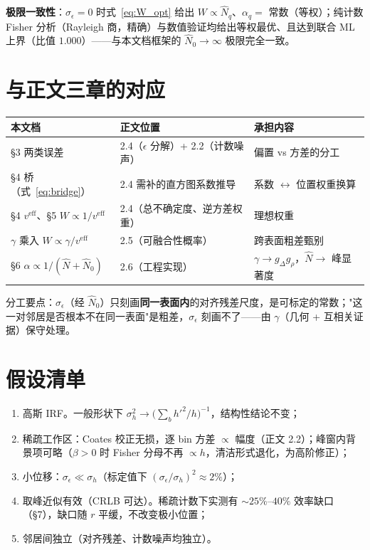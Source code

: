 \documentclass[11pt]{ctexart}
\begin{document}
\textbf{极限一致性}：$\sigma_\epsilon=0$ 时式~\eqref{eq:W_opt} 给出 $W\propto\hat N_q$、$\alpha_q=$ 常数（等权）；纯计数 Fisher 分析（Rayleigh 商，精确）与数值验证均给出等权最优、且达到联合 ML 上界（比值 $1.000$）——与本文档框架的 $\hat N_0\to\infty$ 极限完全一致。

\section{与正文三章的对应}

\begin{center}
\small
\begin{tabular}{@{}lll@{}}
\toprule
本文档 & 正文位置 & 承担内容 \\
\midrule
\S3 两类误差 & 2.4（$\epsilon$ 分解）+ 2.2（计数噪声） & 偏置 vs 方差的分工 \\
\S4 桥（式~\eqref{eq:bridge}） & 2.4 需补的直方图系数推导 & 系数 $\leftrightarrow$ 位置权重换算 \\
\S4 $v^{\mathrm{eff}}$、\S5 $W\propto1/v^{\mathrm{eff}}$ & 2.4（总不确定度、逆方差权重） & 理想权重 \\
$\gamma$ 乘入 $W\propto\gamma/v^{\mathrm{eff}}$ & 2.5（可融合性概率） & 跨表面粗差甄别 \\
\S6 $\alpha\propto1/(\hat N+\hat N_0)$ & 2.6（工程实现） & $\gamma\to g_\Delta g_\rho$，$\hat N\to$ 峰显著度 \\
\bottomrule
\end{tabular}
\end{center}

分工要点：$\sigma_\epsilon$（经 $\hat N_0$）只刻画\textbf{同一表面内}的对齐残差尺度，是可标定的常数；"这一对邻居是否根本不在同一表面"是粗差，$\sigma_\epsilon$ 刻画不了——由 $\gamma$（几何 + 互相关证据）保守处理。

\section{假设清单}

\begin{enumerate}
  \item 高斯 IRF。一般形状下 $\sigma_h^2\to\big(\sum_bh'^2/h\big)^{-1}$，结构性结论不变；
  \item 稀疏工作区：Coates 校正无损，逐 bin 方差 $\propto$ 幅度（正文 2.2）；峰窗内背景项可略（$\beta>0$ 时 Fisher 分母不再 $\propto h$，清洁形式退化，为高阶修正）；
  \item 小位移：$\sigma_\epsilon\ll\sigma_h$（标定值下 $(\sigma_\epsilon/\sigma_h)^2\approx2\%$）；
  \item 取峰近似有效（CRLB 可达）。稀疏计数下实测有 $\sim25\%$--$40\%$ 效率缺口（\S7），缺口随 $r$ 平缓，不改变极小位置；
  \item 邻居间独立（对齐残差、计数噪声均独立）。
\end{enumerate}
\end{document}
